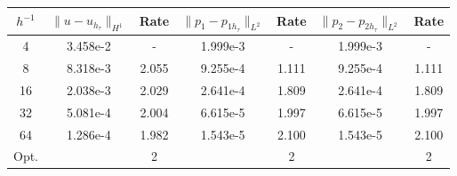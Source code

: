 \\
\\
\begin{center} 
\centering
\begin{tabular}{c|c|c|c|c|c|c}
$h^{-1}$ & $\|u - u_{h_{\tau}}\|_{H^1}$ & Rate & $\|p_1 - p_{1h_{\tau}}\|_{L^2}$ & Rate & $\|p_2 - p_{2h_{\tau}}\|_{L^2}$ & Rate\\\hline
4  & 3.458e-2 & -     & 1.999e-3 & -     & 1.999e-3 & - \\
8  & 8.318e-3 & 2.055 & 9.255e-4 & 1.111 & 9.255e-4 & 1.111 \\
16 & 2.038e-3 & 2.029 & 2.641e-4 & 1.809 & 2.641e-4 & 1.809 \\
32 & 5.081e-4 & 2.004 & 6.615e-5 & 1.997 & 6.615e-5 & 1.997 \\
64 & 1.286e-4 & 1.982 & 1.543e-5 & 2.100 & 1.543e-5 & 2.100 \\\hline
Opt. & & 2 & & 2 & & 2
\end{tabular}
 \label{tab:bb_no_transfer_space_error}
\end{center}

\clearpage

